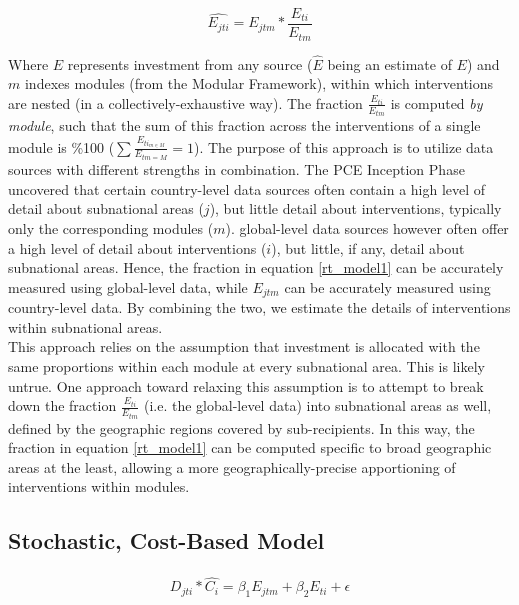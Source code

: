 \documentclass[twocolumn]{bmcart}%
\begin{document}
\begin{equation} \label{rt_model1}
\widehat{E_{jti}}=E_{jtm}*\frac{E_{ti}}{E_{tm}}
\end{equation}

Where $E$ represents investment from any source ($\hat{E}$ being an estimate of $E$) and $m$ indexes modules (from the Modular Framework), within which interventions are nested (in a collectively-exhaustive way). The fraction $\frac{E_{ti}}{E_{tm}}$ is computed \textit{by module}, such that the sum of this fraction across the interventions of a single module is \%100 ($\sum \frac{E_{ti_{m\in M}}}{E_{tm=M}}=1$). The purpose of this approach is to utilize data sources with different strengths in combination. The PCE Inception Phase uncovered that certain country-level data sources often contain a high level of detail about subnational areas ($j$), but little detail about interventions, typically only the corresponding modules ($m$). global-level data sources however often offer a high level of detail about interventions ($i$), but little, if any, detail about subnational areas. Hence, the fraction in equation \ref{rt_model1} can be accurately measured using global-level data, while $E_{jtm}$ can be accurately measured using country-level data. By combining the two, we estimate the details of interventions within subnational areas.\\

This approach relies on the assumption that investment is allocated with the same proportions within each module at every subnational area. This is likely untrue. One approach toward relaxing this assumption is to attempt to break down the fraction $\frac{E_{ti}}{E_{tm}}$ (i.e. the global-level data) into subnational areas as well, defined by the geographic regions covered by sub-recipients. In this way, the fraction in equation \ref{rt_model1} can be computed specific to broad geographic areas at the least, allowing a more geographically-precise apportioning of interventions within modules.

\subsection{Stochastic, Cost-Based Model}

\begin{align}
  D_{jti} * \widehat{C_i} = \beta_1 E_{jtm} + \beta_2 E_{ti} + \epsilon
\end{align}
\end{document}
